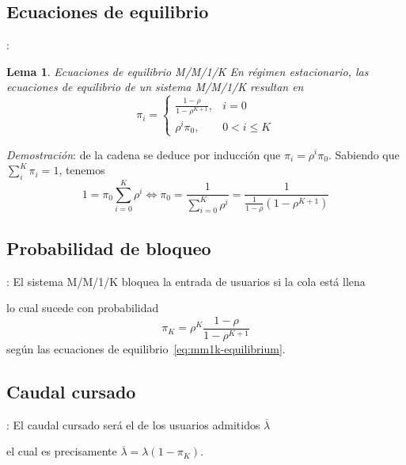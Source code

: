 \documentclass[xcolor={x11names}]{beamer}
\newtheorem{lema}{Lema}[section]
\begin{document}
\subsection{Ecuaciones de equilibrio}
\begin{frame}{\secname: \subsecname}
    \begin{lema}{Ecuaciones de equilibrio M/M/1/K}
        En régimen estacionario, las ecuaciones de
        equilibrio de un sistema M/M/1/K
        resultan en
        \begin{equation}
            \pi_i =
            \begin{cases}
                \frac{1-\rho}{1-\rho^{K+1}}, & i=0\\
                \rho^i\pi_0, & 0<i\leq K
            \end{cases}
            \label{eq:mm1k-equilibrium}
        \end{equation}
    \end{lema}
    \vfill
    \textit{Demostración}: de la cadena se deduce
    por inducción que $\pi_i=\rho^i \pi_0$.
    Sabiendo que $\sum_i^K \pi_i=1$, tenemos
    \begin{equation*}
        1=\pi_0\sum_{i=0}^K\rho^i
        \Longleftrightarrow
        \pi_0=\frac{1}{\sum_{i=0}^K \rho^i}
        =\frac{1}{\frac{1}{1-\rho}(1-\rho^{K+1})}
    \end{equation*}
\end{frame}


\subsection{Probabilidad de bloqueo}
\begin{frame}{\secname: \subsecname}
    El sistema M/M/1/K bloquea la
    entrada de usuarios si
    la cola está llena
    \begin{figure}
        \resizebox{!}{.15\textwidth}{%
            
        }
    \end{figure}
    lo cual sucede con probabilidad
    \begin{equation*}
        \pi_K=\rho^K\frac{1-\rho}{1-\rho^{K+1}}
    \end{equation*}
    según las ecuaciones de
    equilibrio~\eqref{eq:mm1k-equilibrium}.
\end{frame}




\subsection{Caudal cursado}
\begin{frame}{\secname: \subsecname}
    El caudal cursado será el de los
    usuarios admitidos $\overline{\lambda}$
    \begin{figure}
        \resizebox{!}{.25\textwidth}{%
            
        }
    \end{figure}
    el cual es precisamente
    $\overline{\lambda}=\lambda(1-\pi_K)$.
\end{frame}
\end{document}
